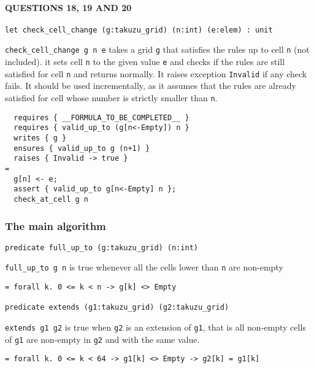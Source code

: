 \hypertarget{questions-18-19-and-20}{%
\paragraph{QUESTIONS 18, 19 AND 20}\label{questions-18-19-and-20}}

\begin{verbatim}
let check_cell_change (g:takuzu_grid) (n:int) (e:elem) : unit
\end{verbatim}

\texttt{check\_cell\_change\ g\ n\ e} takes a grid \texttt{g} that
satisfies the rules up to cell \texttt{n} (not included). it sets cell
\texttt{n} to the given value \texttt{e} and checks if the rules are
still satisfied for cell \texttt{n} and returns normally. It raises
exception \texttt{Invalid} if any check fails. It should be used
incrementally, as it assumes that the rules are already satisfied for
cell whose number is strictly smaller than \texttt{n}.

\begin{verbatim}
  requires { __FORMULA_TO_BE_COMPLETED__ }
  requires { valid_up_to (g[n<-Empty]) n }
  writes { g }
  ensures { valid_up_to g (n+1) }
  raises { Invalid -> true }
=
  g[n] <- e;
  assert { valid_up_to g[n<-Empty] n };
  check_at_cell g n
\end{verbatim}

\hypertarget{the-main-algorithm}{%
\subsubsection{The main algorithm}\label{the-main-algorithm}}

\begin{verbatim}
predicate full_up_to (g:takuzu_grid) (n:int)
\end{verbatim}

\texttt{full\_up\_to\ g\ n} is true whenever all the cells lower than
\texttt{n} are non-empty

\begin{verbatim}
= forall k. 0 <= k < n -> g[k] <> Empty

predicate extends (g1:takuzu_grid) (g2:takuzu_grid)
\end{verbatim}

\texttt{extends\ g1\ g2} is true when \texttt{g2} is an extension of
\texttt{g1}, that is all non-empty cells of \texttt{g1} are non-empty in
\texttt{g2} and with the same value.

\begin{verbatim}
= forall k. 0 <= k < 64 -> g1[k] <> Empty -> g2[k] = g1[k]
\end{verbatim}


